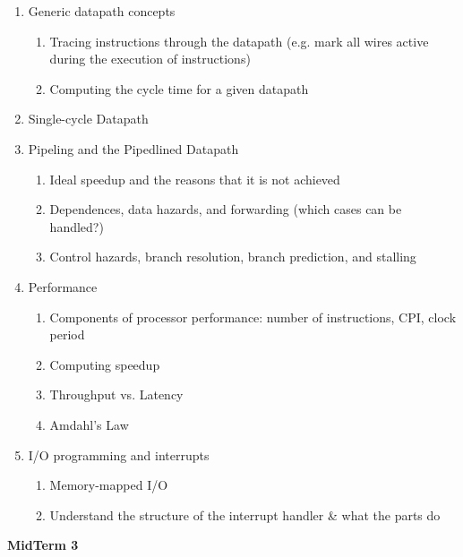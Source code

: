 \documentclass[12pt]{article}
\renewcommand{\=}[1]{\stackrel{#1}{=}} %
\theoremstyle{definition}
\theoremstyle{remark}
\begin{document}
  \begin{enumerate}
  \item Generic datapath concepts
    \begin{enumerate}
    \item Tracing instructions through the datapath (e.g. mark all
      wires active during the execution of instructions)
    \item Computing the cycle time for a given datapath
    \end{enumerate}
  \item Single-cycle Datapath
  \item Pipeling and the Pipedlined Datapath
    \begin{enumerate}
    \item Ideal speedup and the reasons that it is not achieved
    \item Dependences, data hazards, and forwarding (which cases can
      be handled?)
    \item Control hazards, branch resolution, branch prediction, and stalling
    \end{enumerate}
  \item Performance
    \begin{enumerate}
    \item Components of processor performance: number of instructions,
      CPI, clock period
    \item Computing speedup
    \item Throughput vs. Latency
    \item Amdahl's Law
    \end{enumerate}
  \item I/O programming and interrupts
    \begin{enumerate}
    \item Memory-mapped I/O
    \item Understand the structure of the interrupt handler \& what
      the parts do
    \end{enumerate}
  \end{enumerate}
  \textbf{MidTerm 3}
\end{document}
